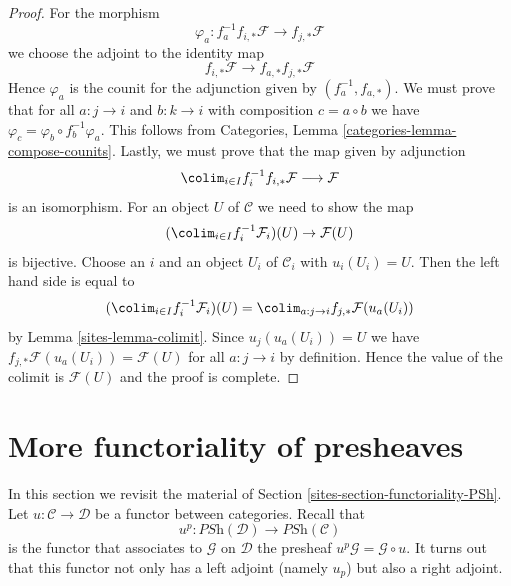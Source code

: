 \begin{proof}

For the morphism
$$
\varphi_a : f_a^{-1}f_{i, *}\mathcal{F} \to f_{j, *}\mathcal{F}
$$
we choose the adjoint to the identity map
$$
f_{i, *}\mathcal{F} \to f_{a, *}f_{j, *}\mathcal{F}
$$
Hence $\varphi_a$ is the counit for the adjunction given by
$(f_a^{-1}, f_{a, *})$. We must prove that for all
$a : j \to i$ and $b : k \to i$ with composition $c = a \circ b$
we have
$\varphi_c = \varphi_b \circ f_b^{-1}\varphi_a$.
This follows from Categories, Lemma \ref{categories-lemma-compose-counits}.
Lastly, we must prove that the map given by adjunction
$$
\colim_{i \in I} f_i^{-1}f_{i, *}\mathcal{F}
\longrightarrow
\mathcal{F}
$$
is an isomorphism. For an object $U$ of $\mathcal{C}$
we need to show the map
$$
(\colim_{i \in I} f_i^{-1}\mathcal{F}_i)(U) \to \mathcal{F}(U)
$$
is bijective. Choose an $i$ and an object $U_i$ of $\mathcal{C}_i$
with $u_i(U_i) = U$. Then the left hand side is equal to
$$
(\colim_{i \in I} f_i^{-1}\mathcal{F}_i)(U) =
\colim_{a : j \to i} f_{j, *}\mathcal{F}(u_a(U_i))
$$
by Lemma \ref{sites-lemma-colimit}. Since $u_j(u_a(U_i)) = U$
we have $f_{j, *}\mathcal{F}(u_a(U_i)) = \mathcal{F}(U)$
for all $a : j \to i$ by definition. Hence the value of the colimit is
$\mathcal{F}(U)$ and the proof is complete.
\end{proof}

\section{More functoriality of presheaves}
\label{sites-section-more-functoriality-PSh}
In this section we revisit the material of
Section \ref{sites-section-functoriality-PSh}.
Let $u : \mathcal{C} \to \mathcal{D}$ be a functor between categories.
Recall that
$$
u^p :
\textit{PSh}(\mathcal{D})
\longrightarrow
\textit{PSh}(\mathcal{C})
$$
is the functor that associates to $\mathcal{G}$ on $\mathcal{D}$ the presheaf
$u^p\mathcal{G} = \mathcal{G} \circ u$. It turns out that this functor
not only has a left adjoint (namely $u_p$) but also a right adjoint.

